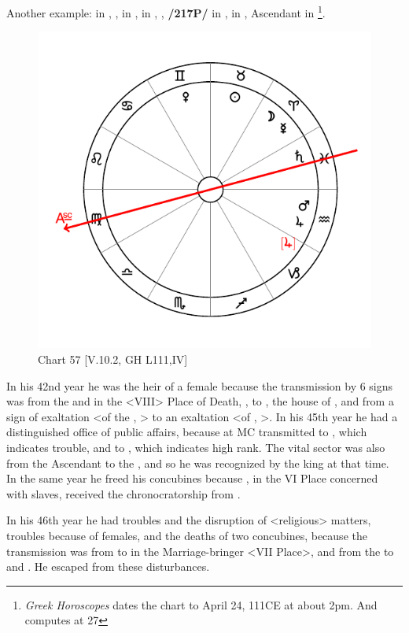 Another example: \Sun\xspace in \Taurus, \Moon, \Mercury\xspace in \Aries, \Saturn\xspace in \Pisces, \Jupiter, \textbf{/217P/} \Mars\xspace in \Aquarius, \Venus\xspace in \Gemini, Ascendant in \Virgo\footnote{\textit{Greek Horoscopes} dates the chart to April 24, 111CE at about 2pm. And computes \Jupiter\xspace at 27 \Capricorn}. 

\begin{figure}
\centering
\vspace{-20pt}
\includegraphics[width=.68\textwidth]{charts/5_10_02}
\caption{Chart 57 [V.10.2, GH L111,IV]}
\label{fig:chart57}
\end{figure}

In his 42nd year he was the heir of a female because the transmission by 6 signs was from the \Moon\xspace and \Mercury\xspace in the <VIII> Place of Death, \Aries, to \Virgo\xspace <the Ascendant>, the house of \Mercury, and from a sign of exaltation <of the \Sun, \Aries> to an exaltation <of \Mercury, \Virgo>. In his 45th year he had a distinguished office of public affairs, because \Venus\xspace at MC transmitted to \Mars, which indicates trouble, and to \Jupiter, which indicates high rank. The vital sector was also from the Ascendant to the \Sun, and so he was recognized by the king at that time. In the same year he freed his concubines because \Jupiter, in the VI Place concerned with slaves, received the
chronocratorship from \Venus. 

In his 46th year he had troubles and the disruption of <religious> matters, troubles because of females, and the deaths of two concubines, because the transmission was from \Venus\xspace to
\Saturn\xspace in the Marriage-bringer <VII Place>, and from the \Sun\xspace to \Mars\xspace and \Jupiter. He escaped from these
disturbances.

